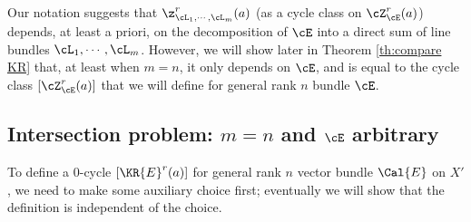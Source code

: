 \begin{remark}
\notready Our notation suggests that $\z^{r}_{\cL_{1},\cdots, \cL_{m}}(a)$ (as a cycle class on $\cZ_{\cE}^{r}(a)$) depends, at least a priori, on the decomposition of $\cE$ into a direct sum of line bundles $\cL_{1},\cdots, \cL_{m}$.  However, we will show later in Theorem \ref{th:compare KR}  that, at least when $m=n$, it only depends on $\cE$, and is equal to the cycle class $[\cZ^{r}_{\cE}(a)]$ that we will define for general rank $n$ bundle $\cE$.
\end{remark}






\subsection{Intersection problem: $m=n$ and $\cE$ arbitrary}\label{ssec: intersection problem}





To define a $0$-cycle $[\KR{E}^r(a)] $ for general rank $n$ vector bundle $\Cal{E}$ on $X'$, we need to make some auxiliary choice first; eventually we will show that the definition is independent of the choice.



